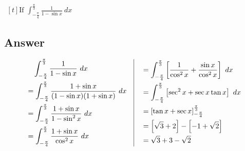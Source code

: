 \documentclass[17pt]{extarticle}
\begin{document}
\begin{fleqn}
$\begin{aligned}[t] 
\text{If \ } \int_{-\frac{\pi}{4}}^{\frac{\pi}{3}} \frac{1}{1 - \sin x}\ dx
\end{aligned}$

\subsection*{Answer}
\begin{equation} \nonumber
\begin{alignedat}{4}
& \quad  \int_{-\frac{\pi}{4}}^{\frac{\pi}{3}} \frac{1}{1 - \sin x}\ dx\\
&= \int_{-\frac{\pi}{4}}^{\frac{\pi}{3}} \frac{1+\sin x}{(1 - \sin x)(1 + \sin x)}\ dx\\
&= \int_{-\frac{\pi}{4}}^{\frac{\pi}{3}} \frac{1+\sin x}{1 - \sin^2x}\ dx\\
&= \int_{-\frac{\pi}{4}}^{\frac{\pi}{3}} \frac{1+\sin x}{\cos^2x}\ dx\\
\end{alignedat}
\quad
\vrule
\quad
\begin{alignedat}{4}
&= \int_{-\frac{\pi}{4}}^{\frac{\pi}{3}} \left[\frac{1}{\cos^2x} + \frac{\sin x}{\cos^2x}\right] \ dx\\
&= \int_{-\frac{\pi}{4}}^{\frac{\pi}{3}} \left[\sec^2x + \sec x \tan x \right] \ dx\\
&= \left[\tan x + \sec x \right]_{-\frac{\pi}{4}}^{\frac{\pi}{3}}\\
&= \left[ \sqrt{3}+2\right] - \left[-1 + \sqrt{2}\right]\\
&= \sqrt{3}+3 - \sqrt{2} \\
\end{alignedat}
\end{equation}


\end{fleqn}
\end{document}
